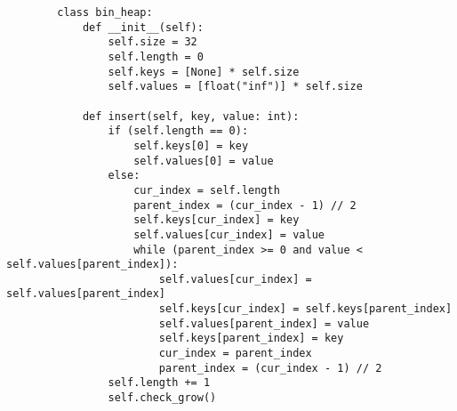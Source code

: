     \begin{lstlisting}
        class bin_heap:
            def __init__(self):
                self.size = 32
                self.length = 0
                self.keys = [None] * self.size
                self.values = [float("inf")] * self.size

            def insert(self, key, value: int):
                if (self.length == 0):
                    self.keys[0] = key
                    self.values[0] = value            
                else:
                    cur_index = self.length
                    parent_index = (cur_index - 1) // 2
                    self.keys[cur_index] = key
                    self.values[cur_index] = value
                    while (parent_index >= 0 and value < self.values[parent_index]):
                        self.values[cur_index] = self.values[parent_index]
                        self.keys[cur_index] = self.keys[parent_index]
                        self.values[parent_index] = value
                        self.keys[parent_index] = key
                        cur_index = parent_index
                        parent_index = (cur_index - 1) // 2
                self.length += 1
                self.check_grow()


\end{lstlisting}
